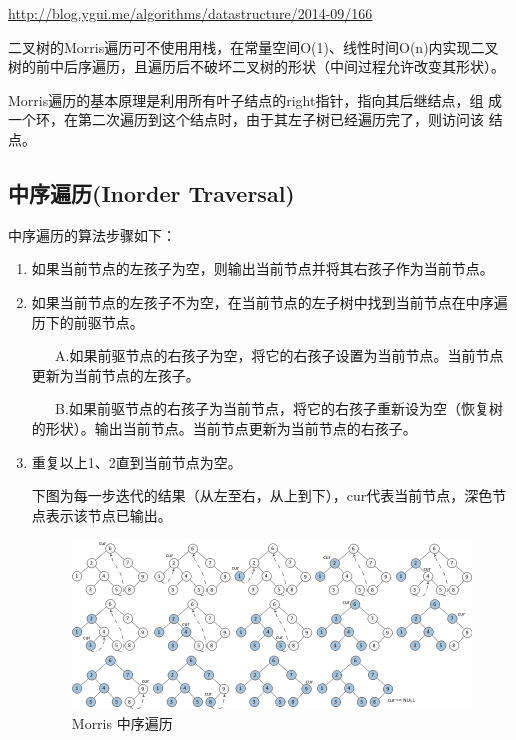 \documentclass[12pt]{book}
\begin{document}
\url{http://blog.ygui.me/algorithms/datastructure/2014-09/166}

二叉树的Morris遍历可不使用用栈，在常量空间O(1)、线性时间O(n)内实现二叉树的前中后序遍历，且遍历后不破坏二叉树的形状（中间过程允许改变其形状）。

Morris遍历的基本原理是利用所有叶子结点的right指针，指向其后继结点，组
成一个环，在第二次遍历到这个结点时，由于其左子树已经遍历完了，则访问该
结点。

\subsection{中序遍历(Inorder Traversal)}
\label{sec-4-1-1}

中序遍历的算法步骤如下：

\begin{enumerate}
\item 如果当前节点的左孩子为空，则输出当前节点并将其右孩子作为当前节点。
\label{sec-4-1-1-1}

\item 如果当前节点的左孩子不为空，在当前节点的左子树中找到当前节点在中序遍历下的前驱节点。
\label{sec-4-1-1-2}

~ ~ A.如果前驱节点的右孩子为空，将它的右孩子设置为当前节点。当前节点更新为当前节点的左孩子。

~ ~ B.如果前驱节点的右孩子为当前节点，将它的右孩子重新设为空（恢复树的形状）。输出当前节点。当前节点更新为当前节点的右孩子。

\item 重复以上1、2直到当前节点为空。
\label{sec-4-1-1-3}

下图为每一步迭代的结果（从左至右，从上到下），cur代表当前节点，深色节点表示该节点已输出。

\begin{figure}[htb]
\centering
\includegraphics[width=.9\linewidth]{./pic/morrIn.jpg}
\caption{Morris 中序遍历}
\end{figure}


\end{enumerate}
\end{document}

